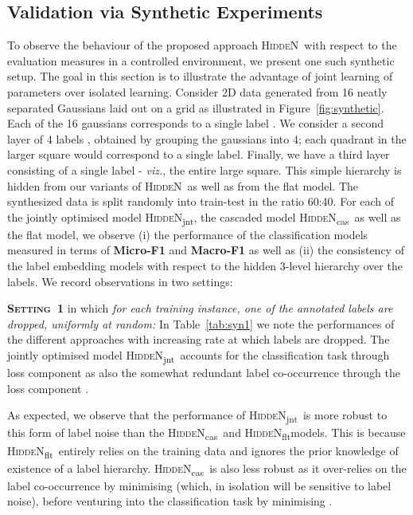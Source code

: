 \documentclass[11pt,a4paper]{article}
\newcommand{\model}{\mbox{\textsc{HiddeN}}}
\newcommand{\modeljnt}{\mbox{\textsc{HiddeN}\textsubscript{jnt}}}
\newcommand{\modelcas}{\mbox{\textsc{HiddeN}\textsubscript{cas}}}
\newcommand{\modelflt}{\mbox{\textsc{HiddeN}\textsubscript{flt}}}
\begin{document}
\subsection{Validation via Synthetic Experiments}
To observe the behaviour of the proposed approach \model\ with respect to the evaluation measures in a controlled environment, we present one such synthetic setup. The goal in this section is to illustrate the advantage of joint learning of parameters over isolated learning. Consider 2D data generated from 16 neatly separated Gaussians laid out on a grid as illustrated in Figure~\ref{fig:synthetic}. Each of the 16 gaussians corresponds to a single label . We consider a second layer of 4 labels , obtained by grouping the gaussians into 4; each quadrant in the larger square would correspond to a single label.  Finally, we have a third layer consisting of a single label  - {\em viz.}, the entire large square. This simple hierarchy is hidden from our variants of \model\ as well as from the flat model. The synthesized data is split randomly into train-test in the ratio 60:40. For each of the jointly optimised model \modeljnt, the cascaded model \modelcas\ as well as the flat model, we observe (i) the performance of the classification  models  measured in terms of \textbf{Micro-F1} and \textbf{Macro-F1} as well as (ii) the consistency of the label embedding models  with respect to the hidden 3-level hierarchy over the  labels. We record observations in two settings:

{\bf \mbox{\textsc{Setting 1}}} in which {\em for each training instance, one of the annotated labels are dropped, uniformly at random:} In Table~\ref{tab:syn1} we note the performances of the different approaches with increasing rate at which labels are dropped. The jointly optimised model \modeljnt\ accounts for the classification task through loss component  as also the somewhat redundant label co-occurrence through the loss component . 

As expected, we observe that the performance of \modeljnt\ is more robust to this form of label noise than the \modelcas\ and \modelflt models. This is because \modelflt\ entirely relies on the training data and ignores the prior knowledge of existence of a label hierarchy. \modelcas\ is also less robust as it over-relies on the label co-occurrence by minimising  (which, in isolation will be sensitive to label noise), before venturing into the classification task by minimising .
\end{document}
